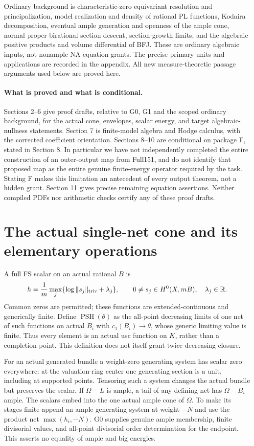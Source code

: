 \documentclass[10pt]{article}
\newcommand{\PSH}{\operatorname{PSH}}
\begin{document}
Ordinary background is characteristic-zero equivariant resolution and
principalization, model realization and density of rational PL functions,
Kodaira decomposition, eventual ample generation and openness of the ample
cone, normal proper birational section descent, section-growth limits, and
the algebraic positive products and volume differential of BFJ. These are
ordinary algebraic inputs, not nonample NA equation grants. The precise
primary units and applications are recorded in the appendix. All new
measure-theoretic passage arguments used below are proved here.

\paragraph{What is proved and what is conditional.}
Sections 2--6 give proof drafts, relative to G0, G1 and the scoped ordinary
background, for the actual cone, envelopes, scalar energy, and target
algebraic-nullness statements. Section 7 is finite-model algebra and Hodge
calculus, with the corrected coefficient orientation. Sections 8--10 are
conditional on package F, stated in Section 8. In particular we have not
independently completed the entire construction of an outer-output map
from Full151, and do not identify that proposed map as the entire genuine
finite-energy operator required by the task. Stating F makes this
limitation an antecedent of every output theorem, not a hidden grant.
Section 11 gives precise remaining equation assertions. Neither compiled
PDFs nor arithmetic checks certify any of these proof drafts.

\section{The actual single-net cone and its elementary operations}
A full FS scalar on an actual rational $B$ is
\[
 h=\frac1m\max_j\{\log\|s_j\|_{\rm triv}+\lambda_j\},\qquad
 0\ne s_j\in H^0(X,mB),\quad\lambda_j\in\mathbb R.
\]
Common zeros are permitted; these functions are extended-continuous and
generically finite. Define $\PSH(\theta)$ as the all-point decreasing
limits of one net of such functions on actual $B_i$ with
$c_1(B_i)\to\theta$, whose generic limiting value is finite. Thus every
element is an actual usc function on $K$, rather than a completion point.
This definition does not itself grant twice-decreasing closure.

For an actual generated bundle a weight-zero generating system has scalar
zero everywhere: at the valuation-ring center one generating section is a
unit, including at supported points. Tensoring such a system changes the
actual bundle but preserves the scalar. If $\Omega-L$ is ample, a tail of
any defining net has $\Omega-B_i$ ample. The scalars embed into the one
actual ample cone of $\Omega$. To make its stages finite append an ample
generating system at weight $-N$ and use the product net
$\max(h_i,-N)$. G0 supplies genuine ample membership, finite divisorial
values, and all-point divisorial order determination for the endpoint.
This asserts no equality of ample and big energies.
\end{document}
